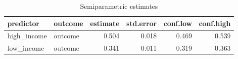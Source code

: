 \begin{table}[ht]
\centering
\begin{tabular}{llrrrr}
  \hline
predictor & outcome & estimate & std.error & conf.low & conf.high \\ 
  \hline
high\_income & outcome & 0.504 & 0.018 & 0.469 & 0.539 \\ 
  low\_income & outcome & 0.341 & 0.011 & 0.319 & 0.363 \\ 
   \hline
\end{tabular}
\caption{Semiparametric estimates} 
\label{tab:ei-estimates}
\end{table}
